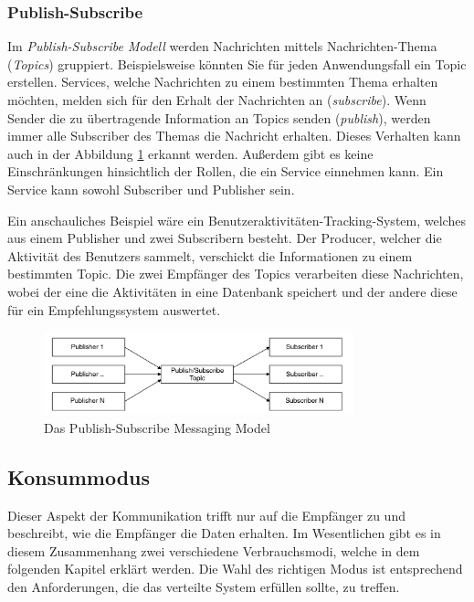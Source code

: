 \subsubsection{Publish-Subscribe}

Im \emph{Publish-Subscribe Modell} werden Nachrichten mittels Nachrichten-Thema (\emph{Topics}) gruppiert. Beispielsweise könnten Sie für jeden Anwendungsfall ein Topic erstellen. Services, welche Nachrichten zu einem bestimmten Thema erhalten möchten, melden sich für den Erhalt der Nachrichten an (\emph{subscribe}). Wenn Sender die zu übertragende Information an Topics senden (\emph{publish}), werden immer alle Subscriber des Themas die Nachricht erhalten. Dieses Verhalten kann auch in der Abbildung \ref{fig:publish-subscribeMOM} erkannt werden. 
Außerdem gibt es keine Einschränkungen hinsichtlich der Rollen, die ein Service einnehmen kann. Ein Service kann sowohl Subscriber und Publisher sein. \cite{curryMessageOrientedMiddleware2004}

Ein anschauliches Beispiel wäre ein Benutzeraktivitäten-Tracking-System, welches aus einem Publisher und zwei Subscribern besteht. Der Producer, welcher die Aktivität des Benutzers sammelt,  verschickt die Informationen zu einem bestimmten Topic. Die zwei Empfänger des Topics verarbeiten diese Nachrichten, wobei der eine die Aktivitäten in eine Datenbank speichert und der andere diese für ein Empfehlungssystem auswertet. \cite{curryMessageOrientedMiddleware2004}

\begin{figure}
    \centering
    \includegraphics[width=0.8\textwidth]{content/img/Research/Message_Services/publish-subscribeMOM.png}
    \caption{Das Publish-Subscribe Messaging Model  \cite{curryMessageOrientedMiddleware2004}}
    \label{fig:publish-subscribeMOM}
\end{figure}
\FloatBarrier

\subsection{Konsummodus}

Dieser Aspekt der Kommunikation trifft nur auf die Empfänger zu und beschreibt, wie die Empfänger die Daten erhalten. Im Wesentlichen gibt es in diesem Zusammenhang zwei verschiedene Verbrauchsmodi, welche in dem folgenden Kapitel erklärt werden. Die Wahl des richtigen Modus ist entsprechend den Anforderungen, die das verteilte System erfüllen sollte, zu treffen.

